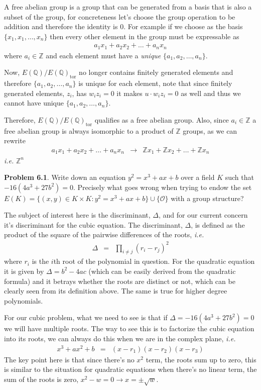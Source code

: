 \documentclass[aps,preprint,preprintnumbers,nofootinbib,showpacs,prd]{revtex4-1}
\newcommand{\ie}{{\it i.e.} }
\newcommand{\nbea}{\begin{eqnarray*}}
\newcommand{\neea}{\end{eqnarray*}}
\DeclareMathOperator{\tor}{tor}
\begin{document}
A free abelian group is a group that can be generated from a basis that is also a subset of the group, for concreteness let's choose the group operation to be addition and therefore the identity is 0. For example if we choose as the basis $\{x_1,x_1,\ldots,x_n\}$ then every other element in the group must be expressable as
%
\nbea
a_1 x_1 + a_2x_2 + \ldots + a_n x_n
\neea
%
where $a_i \in \mathbb{Z}$ and each element must have a {\it unique} $\{a_1, a_2, \ldots, a_n\}$.

Now, $E(\mathbb{Q})/E(\mathbb{Q})_{\tor}$ no longer contains finitely generated elements and therefore $\{a_1, a_2, \ldots, a_n\}$ is unique for each element, note that since finitely generated elements, $z_i$, has $w_i z_i = 0$ it makes $u\cdot w_i z_i = 0$ as well and thus we cannot have unique $\{a_1, a_2, \ldots, a_n\}$.

Therefore, $E(\mathbb{Q})/E(\mathbb{Q})_{\tor}$ qualifies as a free abelian group. Also, since $a_i \in \mathbb{Z}$ a free abelian group is always isomorphic to a product of $\mathbb{Z}$ groups, as we can rewrite
%
\nbea
a_1 x_1 + a_2x_2 + \ldots + a_n x_n & \to & \mathbb{Z}x_1 + \mathbb{Z}x_2 + \ldots + \mathbb{Z} x_n
\neea
%
\ie $\mathbb{Z}^n$

{\bf Problem 6.1}. Write down an equation $y^2 = x^3 + ax + b$ over a field $K$ such that
$-16(4a^3 +27b^2 ) = 0$. Precisely what goes wrong when trying to endow the set $E(K) = \{(x, y) \in K \times K : y^2 = x^3 + ax + b\} \cup \{\mathcal{O}\}$ with a group structure?

The subject of interest here is the discriminant, $\Delta$, and for our current concern it's discriminant for the cubic equation. The discriminant, $\Delta$, is defined as the product of the square of the pairwise differences of the roots, \ie
%
\nbea
\Delta & = & \prod_{i \neq j} (r_i - r_j)^2
\neea
%
where $r_i$ is the $i$th root of the polynomial in question. For the quadratic equation it is given by $\Delta = b^2 - 4ac$ (which can be easily derived from the quadratic formula) and it betrays whether the roots are distinct or not, which can be clearly seen from its definition above. The same is true for higher degree polynomials.

For our cubic problem, what we need to see is that if $\Delta = -16(4a^3 +27b^2) = 0$ we will have multiple roots. The way to see this is to factorize the cubic equation into its roots, we can always do this when we are in the complex plane, \ie
%
\nbea
x^3 + ax^2 + b & = & (x-r_1)(x-r_2)(x-r_3)
\neea
%
The key point here is that since there's no $x^2$ term, the roots sum up to zero, this is similar to the situation for quadratic equations when there's no linear term, the sum of the roots is zero, $x^2 - w = 0 \to x = \pm\sqrt{w}$.
\end{document}
